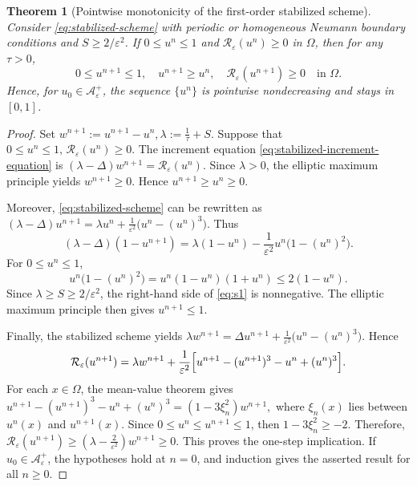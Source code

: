 \documentclass[final, 3p, times]{elsarticle}%
\newcommand{\eps}{\varepsilon}
\newcommand{\Reps}{\mathcal R_\varepsilon}
\newcommand{\Aepsp}{\mathcal A_\varepsilon^+}
\newcommand{\Aeps}{\Aepsp}
\newtheorem{theorem}{Theorem}[section]
\begin{document}
\begin{theorem}[Pointwise monotonicity of the first-order stabilized scheme]
\label{thm:stab1-monotone}
Consider \eqref{eq:stabilized-scheme} with periodic or homogeneous Neumann boundary conditions and $S\ge 2/\eps^2$.
If $0\le u^n\le 1$ and $\Reps(u^n)\ge 0$ in $\Omega$, then for any $\tau>0$,
\[
0\le u^{n+1}\le 1,\quad u^{n+1}\ge u^n,\quad \Reps(u^{n+1})\ge 0\quad\text{in }\Omega.
\]
Hence, for $u_0\in\Aeps$, the sequence $\{u^n\}$ is pointwise nondecreasing and stays in $[0,1]$.
\end{theorem}



\begin{proof}
Set $w^{n+1}:=u^{n+1}-u^n,
    \lambda:=\frac1\tau+S.$
Suppose that
$0\le u^n\le1,\,\Reps(u^n)\ge0.$
The increment equation \eqref{eq:stabilized-increment-equation} is
$
    (\lambda-\Delta)w^{n+1}=\Reps(u^n).
$
Since \(\lambda>0\), the elliptic maximum principle yields
$w^{n+1}\ge0.$
Hence \(u^{n+1}\ge u^n\ge0\).

Moreover, \eqref{eq:stabilized-scheme} can be rewritten as
$
    (\lambda-\Delta)u^{n+1}=\lambda u^n+\frac1{\eps^2}\bigl(u^n-(u^n)^3\bigr).
$
Thus
\begin{equation}
    (\lambda-\Delta)(1-u^{n+1})
    =\lambda(1-u^n)-\frac1{\eps^2}u^n\bigl(1-(u^n)^2\bigr).
    \label{eq:s1}
\end{equation}
For \(0\le u^n\le1\),
\[
    u^n\bigl(1-(u^n)^2\bigr)
    =u^n(1-u^n)(1+u^n)
    \le2(1-u^n).
\]
Since \(\lambda\ge S\ge2/\eps^2\), the right-hand side of \eqref{eq:s1} is nonnegative.
The elliptic maximum principle then gives \(u^{n+1}\le1\).

Finally, the stabilized scheme yields
$
    \lambda w^{n+1}=\Delta u^{n+1}+\frac1{\eps^2}\bigl(u^n-(u^n)^3\bigr).
$
Hence
\[
    \Reps(u^{n+1})
    =\lambda w^{n+1}
    +\frac1{\eps^2}
    \Bigl[u^{n+1}-(u^{n+1})^3-u^n+(u^n)^3\Bigr].
\]
For each \(x\in\Omega\), the mean-value theorem gives
$
    u^{n+1}-(u^{n+1})^3-u^n+(u^n)^3=(1-3\xi_n^2)w^{n+1},
$
where \(\xi_n(x)\) lies between \(u^n(x)\) and \(u^{n+1}(x)\). Since
\(0\le u^n\le u^{n+1}\le1\), then
$1-3\xi_n^2\ge-2.$
Therefore,
$
    \Reps(u^{n+1})\ge\left(\lambda-\frac2{\eps^2}\right)w^{n+1}\ge0.
$
This proves the one-step implication. If \(u_0\in\Aeps\), the hypotheses
hold at \(n=0\), and induction gives the asserted result for all \(n\ge0\).
\end{proof}
\end{document}
